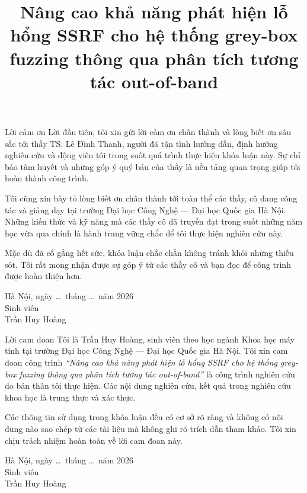 ﻿\documentclass{uetgraduation}
\begin{document}
\title{Nâng cao khả năng phát hiện lỗ hổng SSRF cho hệ thống grey-box fuzzing thông qua phân tích tương tác out-of-band}
\makecovers


\newenvironment{changemargin}[2]{%
  \begin{list}{}{%
    \setlength{\leftmargin}{#1}%
    \setlength{\rightmargin}{#2}%
  }%
  \item[]}{\end{list}}

\begin{preamble}{Lời cảm ơn}
Lời đầu tiên, tôi xin gửi lời cảm ơn chân thành và lòng biết ơn sâu sắc
tới thầy TS. Lê Đình Thanh, người đã tận tình hướng dẫn, định hướng nghiên cứu
và động viên tôi trong suốt quá trình thực hiện khóa luận này. Sự chỉ bảo tâm
huyết và những góp ý quý báu của thầy là nền tảng quan trọng giúp tôi
hoàn thành công trình.

Tôi cũng xin bày tỏ lòng biết ơn chân thành tới toàn thể các thầy, cô
đang công tác và giảng dạy tại trường Đại học Công Nghệ --- Đại học Quốc gia
Hà Nội. Những kiến thức và kỹ năng mà các thầy cô đã truyền đạt trong suốt
những năm học vừa qua chính là hành trang vững chắc để tôi thực hiện
nghiên cứu này.

Mặc dù đã cố gắng hết sức, khóa luận chắc chắn không tránh khỏi những thiếu
sót. Tôi rất mong nhận được sự góp ý từ các thầy cô và bạn đọc để công
trình được hoàn thiện hơn.

\begin{flushright}
Hà Nội, ngày \ldots\ tháng \ldots\ năm 2026 \\[0.5cm]
Sinh viên \\[2cm]
Trần Huy Hoàng
\end{flushright}
\end{preamble}


\begin{preamble}{Lời cam đoan}
Tôi là Trần Huy Hoàng, sinh viên theo học ngành Khoa học máy tính tại trường
Đại học Công Nghệ --- Đại học Quốc gia Hà Nội. Tôi xin cam đoan công trình
\textit{``Nâng cao khả năng phát hiện lỗ hổng SSRF cho hệ thống grey-box fuzzing
thông qua phân tích tương tác out-of-band''} là công
trình nghiên cứu do bản thân tôi thực hiện. Các nội dung nghiên cứu, kết quả
trong nghiên cứu khoa học là trung thực và xác thực.

Các thông tin sử dụng trong khóa luận đều có cơ sở rõ ràng và không có nội dung
nào sao chép từ các tài liệu mà không ghi rõ trích dẫn tham khảo. Tôi xin chịu
trách nhiệm hoàn toàn về lời cam đoan này.

\begin{flushright}
Hà Nội, ngày \ldots\ tháng \ldots\ năm 2026 \\[0.5cm]
Sinh viên \\[2cm]
Trần Huy Hoàng
\end{flushright}
\end{preamble}
\end{document}

